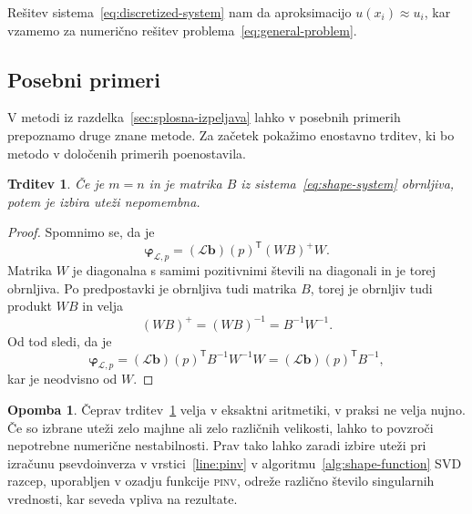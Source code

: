 \documentclass[12pt,a4paper,twoside]{article}
\theoremstyle{definition} %
\newtheorem{opomba}[definicija]{Opomba}
\theoremstyle{plain} %
\newtheorem{trditev}[definicija]{Trditev}
\numberwithin{equation}{section}
\renewcommand{\L}{\mathcal{L}}
\newcommand{\T}{\mathsf{T}}
\renewcommand{\b}{\boldsymbol}
\renewcommand{\phi}{\varphi}
\begin{document}
Rešitev sistema~\eqref{eq:discretized-system} nam da aproksimacijo $u(x_i) \approx u_i$, kar vzamemo
za numerično rešitev problema~\eqref{eq:general-problem}.

\subsection{Posebni primeri}
\label{sec:posebni-primeri}
V metodi iz razdelka~\ref{sec:splosna-izpeljava} lahko v posebnih primerih prepoznamo druge znane
metode. Za začetek pokažimo enostavno trditev, ki bo metodo v določenih primerih poenostavila.
\begin{trditev}
  \label{trd:weight-independence}
  Če je $m = n$ in je matrika $B$ iz sistema~\eqref{eq:shape-system} obrnljiva,
  potem je izbira uteži nepomembna.
\end{trditev}
\begin{proof}
Spomnimo se, da je \[
  \b\phi_{\L, p} = (\L\b{b})(p)^\T(WB)^{+}W.
\]
Matrika $W$ je diagonalna s samimi pozitivnimi števili na diagonali in je torej
obrnljiva. Po predpostavki je obrnljiva tudi matrika $B$, torej je obrnljiv tudi
produkt $WB$ in velja
\[
  (WB)^+ = (WB)^{-1} = B^{-1}W^{-1}.
\]
Od tod sledi, da je
\[
  \b\phi_{\L, p} = (\L\b{b})(p)^\T B^{-1} W^{-1} W = (\L\b{b})(p)^\T B^{-1},
\]
kar je neodvisno od $W$.
\end{proof}
\begin{opomba}
  Čeprav trditev~\ref{trd:weight-independence} velja v eksaktni aritmetiki, v
  praksi ne velja nujno. Če so izbrane uteži zelo majhne ali zelo različnih
  velikosti, lahko to povzroči nepotrebne numerične nestabilnosti. Prav tako
  lahko zaradi izbire uteži pri izračunu psevdoinverza v vrstici~\ref{line:pinv}
  v algoritmu~\ref{alg:shape-function} SVD razcep, uporabljen v ozadju
  funkcije \textsc{pinv}, odreže različno število singularnih vrednosti,
  kar seveda vpliva na rezultate.
\end{opomba}
\end{document}
